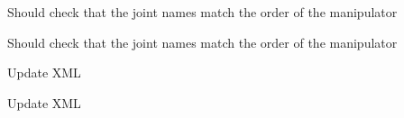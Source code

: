 
\begin{DoxyRefList}
\item[Member \mbox{\hyperlink{namespacetesseract__planning_a5479a76ec33cda8924d0e54d336e5ccc}{tesseract\+\_\+planning\+::Default\+Descartes\+Problem\+Generator}} (const std\+::string \&name, const \mbox{\hyperlink{structtesseract__planning_1_1PlannerRequest}{Planner\+Request}} \&request, const Descartes\+Plan\+Profile\+Map$<$ Float\+Type $>$ \&plan\+\_\+profiles)]\label{todo__todo000005}%
%
Should check that the joint names match the order of the manipulator 

\label{todo__todo000006}%
%
Should check that the joint names match the order of the manipulator  
\item[Member \mbox{\hyperlink{classtesseract__planning_1_1DescartesDefaultPlanProfile_a8bbf9dd170dfc5da44f4117d74ca7a6a}{tesseract\+\_\+planning\+::Descartes\+Default\+Plan\+Profile$<$ Float\+Type $>$\+::Descartes\+Default\+Plan\+Profile}} (const tinyxml2\+::\+XMLElement \&xml\+\_\+element)]\label{todo__todo000002}%
%
Update XML 

\label{todo__todo000003}%
%
Update XML 


\end{DoxyRefList}
